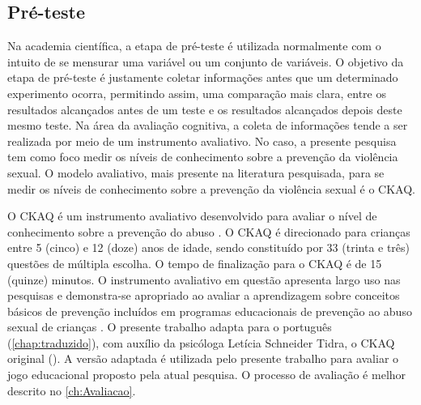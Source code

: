 \subsection{Pré-teste}\label{subsec:preteste}

Na academia científica, a etapa de pré-teste é utilizada normalmente com o intuito de se mensurar uma variável ou um conjunto de variáveis. O objetivo da etapa de pré-teste é justamente coletar informações antes que um determinado experimento ocorra, permitindo assim, uma comparação mais clara, entre os resultados alcançados antes de um teste e os resultados alcançados depois deste mesmo teste. Na área da avaliação cognitiva, a coleta de informações tende a ser realizada por meio de um instrumento avaliativo. No caso, a presente pesquisa tem como foco medir os níveis de conhecimento sobre a prevenção da violência sexual. O modelo avaliativo, mais presente na literatura pesquisada, para se medir os níveis de conhecimento sobre a prevenção da violência sexual é o \acf{CKAQ}.

O \ac{CKAQ} é um instrumento avaliativo desenvolvido para avaliar o nível de conhecimento sobre a prevenção do abuso \cite{tutty1992ability}. O \ac{CKAQ} é direcionado para crianças entre 5 (cinco) e 12 (doze) anos de idade, sendo constituído por 33 (trinta e três) questões de múltipla escolha. O tempo de finalização para o \ac{CKAQ} é de 15 (quinze) minutos. O instrumento avaliativo em questão apresenta largo uso nas pesquisas e demonstra-se apropriado ao avaliar a aprendizagem sobre conceitos básicos de prevenção incluídos em programas educacionais de prevenção ao abuso sexual de crianças \cite{tutty1992ability}. O presente trabalho adapta para o português (\autoref{chap:traduzido}), com auxílio da psicóloga Letícia Schneider Tidra, o \ac{CKAQ} original (). A versão adaptada é utilizada pelo presente trabalho para avaliar o jogo educacional proposto pela atual pesquisa. O processo de avaliação é melhor descrito no \autoref{ch:Avaliacao}.



